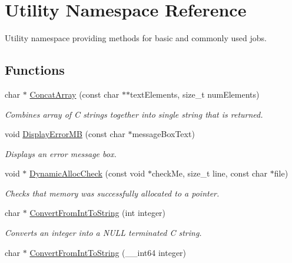 \hypertarget{namespace_utility}{
\section{Utility Namespace Reference}
\label{namespace_utility}
}


Utility namespace providing methods for basic and commonly used jobs.  


\subsection*{Functions}
\begin{DoxyCompactItemize}
\item 
char $\ast$ \hyperlink{namespace_utility_af04a93ab9f0f9a93d9adfdef147466c8}{ConcatArray} (const char $\ast$$\ast$textElements, size\_\-t numElements)
\begin{DoxyCompactList}\small\item\em Combines array of C strings together into single string that is returned. \item\end{DoxyCompactList}\item 
void \hyperlink{namespace_utility_a93db37e7f7dfd02de3a5d130602541e5}{DisplayErrorMB} (const char $\ast$messageBoxText)
\begin{DoxyCompactList}\small\item\em Displays an error message box. \item\end{DoxyCompactList}\item 
void $\ast$ \hyperlink{namespace_utility_ae9b88a37dc2e95519c938e673dd3de2c}{DynamicAllocCheck} (const void $\ast$checkMe, size\_\-t line, const char $\ast$file)
\begin{DoxyCompactList}\small\item\em Checks that memory was successfully allocated to a pointer. \item\end{DoxyCompactList}\item 
char $\ast$ \hyperlink{namespace_utility_a24f29ed5876bcc68f8e1100a245d21fd}{ConvertFromIntToString} (int integer)
\begin{DoxyCompactList}\small\item\em Converts an integer into a NULL terminated C string. \item\end{DoxyCompactList}\item 
char $\ast$ \hyperlink{namespace_utility_ac8c886f95e1fa62ddbfb96a508be945c}{ConvertFromIntToString} (\_\-\_\-int64 integer)
$$
\end{DoxyCompactItemize}
